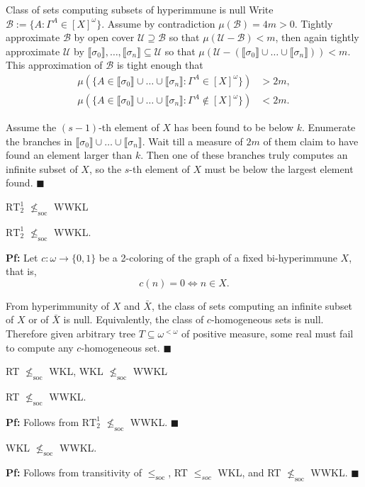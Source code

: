 \begin{frame}{Class of sets computing subsets of hyperimmune is null}
  Write $\mathcal{B} :=\{A: \Gamma^A\in[X]^\omega\}$.
  Assume by contradiction $\mu(\mathcal{B})=4m>0$. Tightly approximate
  $\mathcal{B}$ by open cover $\mathcal{U}\supseteq\mathcal{B}$ so that
  $\mu(\mathcal{U}-\mathcal{B})<m$, then again tightly approximate
  $\mathcal{U}$ by $\llbracket\sigma_0\rrbracket,
  \ldots,\llbracket\sigma_n\rrbracket \subseteq\mathcal{U}$ so
  that $\mu(\mathcal{U}-(\llbracket\sigma_0\rrbracket \cup\ldots
  \cup\llbracket\sigma_n\rrbracket)) <m$. This approximation of
  $\mathcal{B}$ is tight enough that
  \begin{align*}
    \mu(\{A\in\llbracket\sigma_0\rrbracket \cup\ldots\cup
    \llbracket\sigma_n\rrbracket: \Gamma^A\in[X]^\omega\}) &>2m,\\
    \mu(\{A\in\llbracket\sigma_0\rrbracket \cup\ldots\cup
    \llbracket\sigma_n\rrbracket: \Gamma^A\not\in[X]^\omega\}) &<2m.
  \end{align*}

  Assume the $(s-1)$-th element of $X$ has been found to be below $k$.
  Enumerate the branches in $\llbracket\sigma_0\rrbracket \cup\ldots\cup
  \llbracket\sigma_n\rrbracket$.  Wait
  till a measure of $2m$ of them claim to have found an element larger than
  $k$. Then one of these branches truly computes an infinite subset of
  $X$, so the $s$-th element of $X$ must be below the largest element
  found. $\blacksquare$
\end{frame}

\begin{frame}{$\text{RT}_2^1$ $\nleq_{\text{soc}}$ WWKL}
  \begin{thm}
    $\text{RT}_2^1$ $\nleq_{\text{soc}}$ WWKL.
  \end{thm}

  \vspace{1em}
  \textbf{Pf:} Let $c:\omega\rightarrow\{0,1\}$ be a 2-coloring of the
  graph of a fixed bi-hyperimmune $X$, that is,
  \[c(n)=0 \Leftrightarrow n\in X.\]
  
  From hyperimmunity of $X$ and $\bar{X}$, the class of sets computing an
  infinite subset of $X$ or of $\bar{X}$ is null. Equivalently, the class
  of $c$-homogeneous sets is null. Therefore given arbitrary tree
  $T\subseteq\omega^{<\omega}$ of positive measure, some real must fail to
  compute any $c$-homogeneous set. $\blacksquare$
\end{frame}

\begin{frame}{RT $\nleq_{\text{soc}}$ WKL, WKL $\nleq_{\text{soc}}$ WWKL}
  \begin{coro}
    \label{coro:rt-wwkl}
    RT $\nleq_{\text{soc}}$ WWKL.
  \end{coro}
  \textbf{Pf:} Follows from $\text{RT}_2^1$ $\nleq_{\text{soc}}$ WWKL.
  $\blacksquare$

  \vspace{2em}
  \begin{coro}
    WKL $\nleq_{\text{soc}}$ WWKL.
  \end{coro}
  \textbf{Pf:} Follows from transitivity of $\leq_\text{soc}$,
  RT $\leq_{soc}$ WKL, and RT $\nleq_{\text{soc}}$ WWKL. $\blacksquare$
\end{frame}
